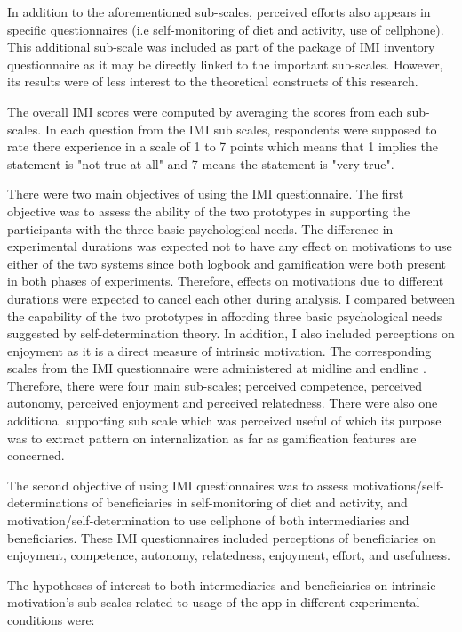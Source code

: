 In addition to the aforementioned sub-scales, perceived efforts also appears in specific questionnaires (i.e self-monitoring of diet and activity, use of cellphone). This additional sub-scale was included as part of the package of IMI inventory questionnaire as it may be directly linked to the important sub-scales. However, its results were of less interest to the theoretical constructs of this research.
  
The overall IMI scores were computed by averaging the scores from each sub-scales. In each question from the IMI sub scales, respondents were supposed to rate there experience in a scale of 1 to 7 points which means that 1 implies the statement is "not true at all" and 7 means the statement is "very true".

There were two main objectives of using the IMI questionnaire. The first objective was to assess the ability of the two prototypes in supporting the participants with the three basic psychological needs. The difference in experimental durations was expected not to have any effect on motivations to use either of the two systems since both logbook and gamification were both present in both phases of experiments. Therefore, effects on motivations due to different durations were expected to cancel each other during analysis. I compared between the capability of the two prototypes in affording three basic psychological needs suggested by self-determination theory. In addition, I also included perceptions on enjoyment as it is a direct measure of intrinsic motivation. The corresponding scales from the IMI questionnaire were administered at midline and endline . Therefore, there were four main sub-scales; perceived competence, perceived autonomy, perceived enjoyment and perceived relatedness. There were also one additional supporting sub scale which was perceived useful of which its purpose was to extract pattern on internalization as far as gamification features are concerned.

The second objective of using IMI questionnaires was to assess motivations/self-determinations of beneficiaries in self-monitoring of diet and activity, and motivation/self-determination to use cellphone of both intermediaries and beneficiaries. These IMI questionnaires included perceptions of beneficiaries on enjoyment, competence, autonomy, relatedness, enjoyment, effort, and usefulness.

The hypotheses of interest to both intermediaries and beneficiaries on intrinsic motivation's sub-scales related to usage of the app in different experimental conditions were:

